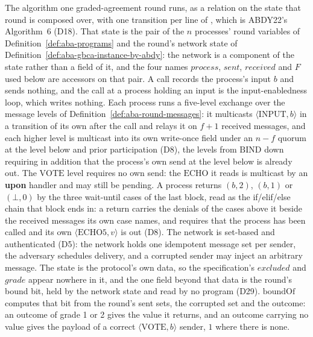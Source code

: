 \begin{definition}
  \label{def:aba-gbca-algorithm-by-abdy}
  \leanok
  The algorithm one graded-agreement round runs, as a relation on the state that round is composed over, with one transition per line of , which is ABDY22's Algorithm~6 (D18).
  That state is the pair of the $n$ processes' round variables of Definition~\ref{def:aba-programs} and the round's network state of Definition~\ref{def:aba-gbca-instance-by-abdy}: the network is a component of the state rather than a field of it, and the four names $process$, $sent$, $received$ and $F$ used below are accessors on that pair.
  A call records the process's input $b$ and sends nothing, and the call at a process holding an input is the input-enabledness loop, which writes nothing.
  Each process runs a five-level exchange over the message levels of Definition~\ref{def:aba-round-messages}: it multicasts $\langle\mathrm{INPUT},b\rangle$ in a transition of its own after the call and relays it on $f{+}1$ received messages, and each higher level is multicast into its own write-once field under an $n{-}f$ quorum at the level below and prior participation (D8), the levels from $\mathrm{BIND}$ down requiring in addition that the process's own send at the level below is already out.
  The $\mathrm{VOTE}$ level requires no own send: the $\mathrm{ECHO}$ it reads is multicast by an \textbf{upon} handler and may still be pending.
  A process returns $(b,2)$, $(b,1)$ or $(\bot,0)$ by the three wait-until cases of the last block, read as the if/elif/else chain that block ends in: a return carries the denials of the cases above it beside the received messages its own case names, and requires that the process has been called and its own $\langle\mathrm{ECHO5},v\rangle$ is out (D8).
  The network is set-based and authenticated (D5): the network holds one idempotent message set per sender, the adversary schedules delivery, and a corrupted sender may inject an arbitrary message.
  The state is the protocol's own data, so the specification's $excluded$ and $grade$ appear nowhere in it, and the one field beyond that data is the round's bound bit, held by the network state and read by no program (D29).
  $\mathrm{boundOf}$ computes that bit from the round's sent sets, the corrupted set and the outcome: an outcome of grade 1 or 2 gives the value it returns, and an outcome carrying no value gives the payload of a correct $\langle\mathrm{VOTE}, b\rangle$ sender, $1$ where there is none.

\end{definition}
